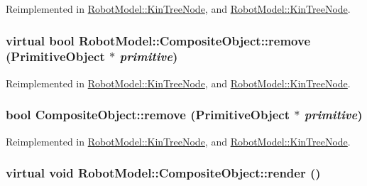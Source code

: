 Reimplemented in \hyperlink{class_robot_model_1_1_kin_tree_node_ae5d72a496f39cad4e266c11d75d4731c}{RobotModel::KinTreeNode}, and \hyperlink{class_robot_model_1_1_kin_tree_node_a08e95447cbb2963b03afbac17215aa00}{RobotModel::KinTreeNode}.\hypertarget{class_robot_model_1_1_composite_object_a2bb6c23e4835fd85391f667b993f7477}{
\subsubsection[{remove}]{\setlength{\rightskip}{0pt plus 5cm}virtual bool RobotModel::CompositeObject::remove ({\bf PrimitiveObject} $\ast$ {\em primitive})}}
\label{class_robot_model_1_1_composite_object_a2bb6c23e4835fd85391f667b993f7477}


Reimplemented in \hyperlink{class_robot_model_1_1_kin_tree_node_ac87cf9db956705dcee63f4dbc01cc664}{RobotModel::KinTreeNode}, and \hyperlink{class_robot_model_1_1_kin_tree_node_a9612cdc54c0a34148ca5350b19a1d385}{RobotModel::KinTreeNode}.\hypertarget{class_robot_model_1_1_composite_object_ac63de1955b6bda820d39c01616af8665}{
\subsubsection[{remove}]{\setlength{\rightskip}{0pt plus 5cm}bool CompositeObject::remove ({\bf PrimitiveObject} $\ast$ {\em primitive})}}
\label{class_robot_model_1_1_composite_object_ac63de1955b6bda820d39c01616af8665}


Reimplemented in \hyperlink{class_robot_model_1_1_kin_tree_node_ac87cf9db956705dcee63f4dbc01cc664}{RobotModel::KinTreeNode}, and \hyperlink{class_robot_model_1_1_kin_tree_node_a9612cdc54c0a34148ca5350b19a1d385}{RobotModel::KinTreeNode}.\hypertarget{class_robot_model_1_1_composite_object_a580d00dd3a303972d34183c07625aed7}{
\subsubsection[{render}]{\setlength{\rightskip}{0pt plus 5cm}virtual void RobotModel::CompositeObject::render ()}}
\label{class_robot_model_1_1_composite_object_a580d00dd3a303972d34183c07625aed7}


